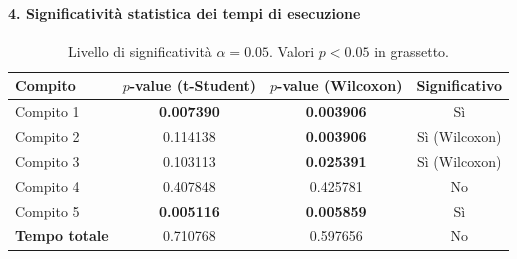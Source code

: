 \clearpage
\paragraph{4. Significatività statistica dei tempi di esecuzione}\mbox{}\par\vspace{0.5ex}
\begin{table}[h!]
    \centering
    \small
    \begin{tabular}{lccc}
        \toprule
        \textbf{Compito} & \textbf{$p$-value (t-Student)} & \textbf{$p$-value (Wilcoxon)} & \textbf{Significativo} \\
        \midrule
        Compito 1 & \textbf{0.007390} & \textbf{0.003906} & Sì \\
        Compito 2 & 0.114138 & \textbf{0.003906} & Sì (Wilcoxon) \\
        Compito 3 & 0.103113 & \textbf{0.025391} & Sì (Wilcoxon) \\
        Compito 4 & 0.407848 & 0.425781 & No \\
        Compito 5 & \textbf{0.005116} & \textbf{0.005859} & Sì \\
        \midrule
        \textbf{Tempo totale} & 0.710768 & 0.597656 & No \\
        \bottomrule
    \end{tabular}
    \caption*{\small Livello di significatività $\alpha = 0.05$. Valori $p < 0.05$ in grassetto.}
\end{table}

